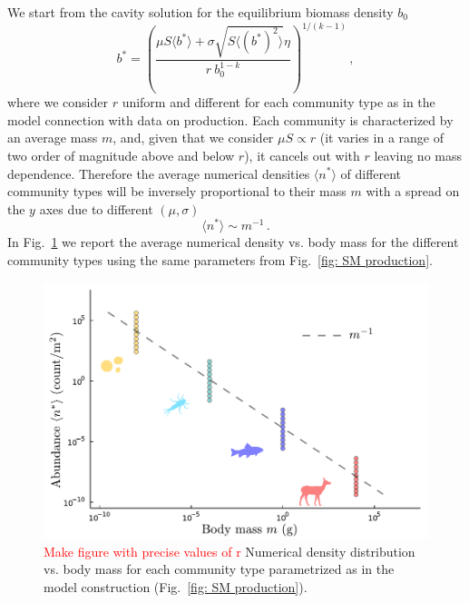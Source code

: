 \documentclass[10pt]{article}
\begin{document}
We start from the cavity solution for the equilibrium biomass density $b_0$
\begin{equation}
    b^* = \left(\frac{\mu S \langle b^* \rangle + \sigma \sqrt{S\langle (b^*)^2\rangle} \eta}
    {r \ b_0^{1-k}}\right)^{1/(k-1)} \, ,
\end{equation}
where we consider $r$ uniform and different for each community type as in the model
connection with data on production.
Each community is characterized by an average mass $m$, and, given that we consider
$\mu S \propto r$ (it varies in a range of two order of magnitude above and below $r$),
it cancels out with $r$ leaving no mass dependence.
Therefore the average numerical densities $\langle n^*\rangle$ 
of different community types will
be inversely proportional to their mass $m$ with a spread on the $y$ axes
due to different $(\mu, \sigma)$
\begin{equation}
    \langle n^*\rangle \sim m^{-1} \, .
\end{equation}
In Fig.~\ref{fig: SM size-density scaling} we report the average numerical density vs. 
body mass for the different community types using the same 
parameters from Fig.~\ref{fig: SM production}.

\begin{figure}[h!]
    \centering
    \includegraphics[width=.8\textwidth]{fig/SM-size-density-scaling.pdf}
    \caption{\textcolor{red}{Make figure with precise values of r} Numerical density distribution vs. body mass for each community 
     type parametrized as in the model construction (Fig.~\ref{fig: SM production}).}
    \label{fig: SM size-density scaling}
\end{figure}

\newpage




\end{document}
